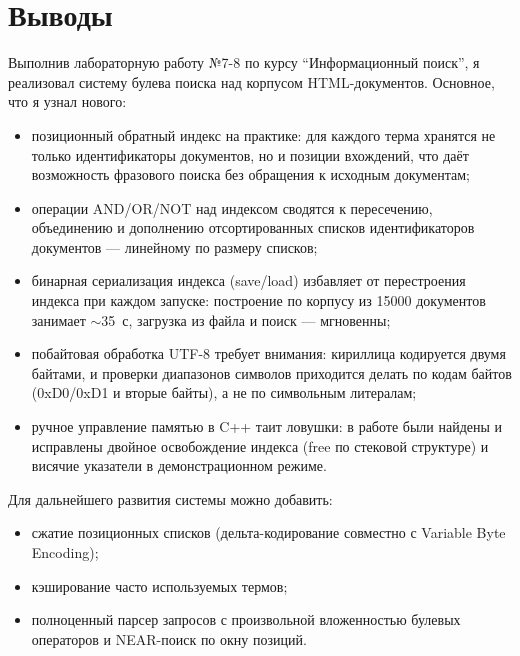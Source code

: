 \section{Выводы}
Выполнив лабораторную работу №7-8 по курсу \enquote{Информационный поиск}, я
реализовал систему булева поиска над корпусом HTML-документов. Основное, что
я узнал нового:

\begin{itemize}
    \item позиционный обратный индекс на практике: для каждого терма хранятся
    не только идентификаторы документов, но и позиции вхождений, что даёт
    возможность фразового поиска без обращения к исходным документам;
    \item операции AND/OR/NOT над индексом сводятся к пересечению, объединению
    и дополнению отсортированных списков идентификаторов документов ---
    линейному по размеру списков;
    \item бинарная сериализация индекса (save/load) избавляет от
    перестроения индекса при каждом запуске: построение по корпусу из 15000
    документов занимает $\sim$35~с, загрузка из файла и поиск --- мгновенны;
    \item побайтовая обработка UTF-8 требует внимания: кириллица кодируется
    двумя байтами, и проверки диапазонов символов приходится делать по кодам
    байтов (0xD0/0xD1 и вторые байты), а не по символьным литералам;
    \item ручное управление памятью в C++ таит ловушки: в работе были найдены
    и исправлены двойное освобождение индекса (free по стековой структуре) и
    висячие указатели в демонстрационном режиме.
\end{itemize}

Для дальнейшего развития системы можно добавить:
\begin{itemize}
    \item сжатие позиционных списков (дельта-кодирование совместно с
    Variable Byte Encoding);
    \item кэширование часто используемых термов;
    \item полноценный парсер запросов с произвольной вложенностью булевых
    операторов и NEAR-поиск по окну позиций.
\end{itemize}

\pagebreak
